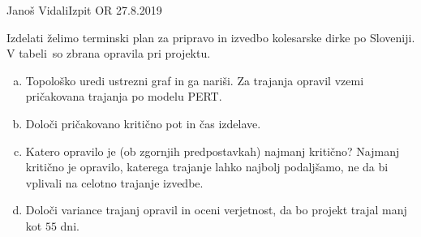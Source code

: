 \begin{naloga}{Janoš Vidali}{Izpit OR 27.8.2019}
\begin{vprasanje}
Izdelati želimo terminski plan
za pripravo in izvedbo kolesarske dirke po Sloveniji.
V tabeli~\tab so zbrana opravila pri projektu.

\begin{enumerate}[(a)]
\item Topološko uredi ustrezni graf in ga nariši.
Za trajanja opravil vzemi pričakovana trajanja po modelu PERT.

\item Določi pričakovano kritično pot in čas izdelave.

\item Katero opravilo je (ob zgornjih predpostavkah) najmanj kritično?
Najmanj kritično je opravilo, katerega trajanje lahko najbolj podaljšamo,
ne da bi vplivali na celotno trajanje izvedbe.

\item Določi variance trajanj opravil in oceni ve\-rjet\-nost,
da bo projekt trajal manj kot $55$ dni.
\end{enumerate}
%
\begin{tabela}
\end{tabela}
\end{vprasanje}


\end{naloga}
